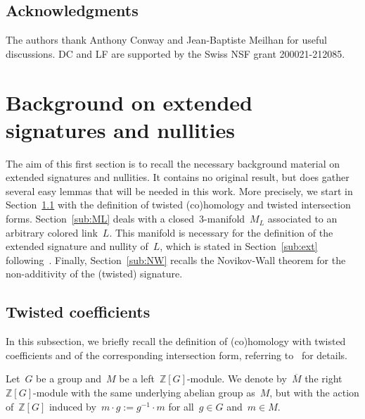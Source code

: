 \documentclass{amsart}
\newcommand{\Z}{\mathbb{Z}}
\theoremstyle{definition}
\theoremstyle{remark}
\newcommand{\dc}[1]{\textcolor{teal}{#1}}
\begin{document}
	\subsection*{Acknowledgments}
The authors thank Anthony Conway and Jean-Baptiste Meilhan for useful discussions.
DC and LF are supported by the Swiss NSF grant 200021-212085.


	\section{Background on extended signatures and nullities}
	\label{sec:background}
	
The aim of this first section is to recall the necessary background material on extended signatures and nullities.
It contains no original result, but does gather several easy lemmas that will be needed in this work.
More precisely, we start in Section~\ref{sub:twisted} with the definition of twisted (co)homology and twisted
intersection forms. Section~\ref{sub:ML} deals with a closed~3-manifold~$M_L$ associated to an arbitrary colored
link~$L$. This manifold is necessary for the definition of the extended signature and nullity of~$L$,
which is stated in Section~\ref{sub:ext} following~\cite{CMP23}. Finally, Section~\ref{sub:NW} recalls the Novikov-Wall theorem for the
non-additivity of the (twisted) signature. 
	
	\subsection{Twisted coefficients}
	\label{sub:twisted}
	
	In this subsection, we briefly recall the definition of (co)homology with twisted coefficients and of the corresponding intersection form, referring to~\cite[Part~XXIX]{Friedl} for details.
	
\medskip

Let~$G$ be a group and~$M$ be a left~$\Z[G]$-module. We denote by~$\overline{M}$ the right~$\Z[G]$-module
with the same underlying abelian group as~$M$, but with the action of~$\Z[G]$ induced by~$m\cdot g:=g^{-1}\cdot m$
for all~$g\in G$ and~$m\in M$.
\end{document}
